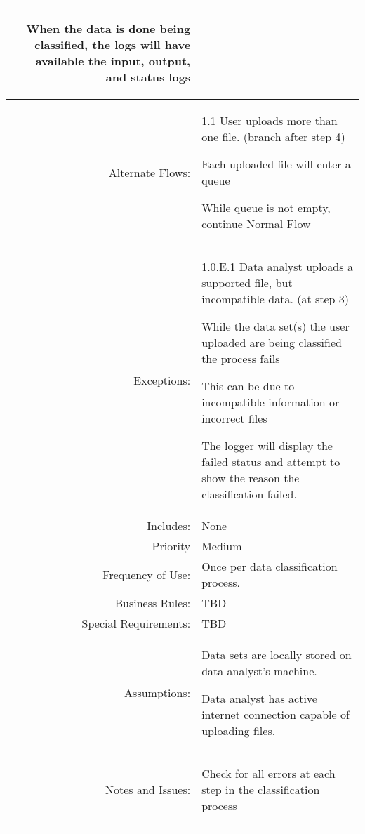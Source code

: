 \documentclass[12pt,oneside,letterpaper]{article}
\newenvironment{packed_enumerate}{ %
\vspace{-7mm}
\begin{enumerate}
  \setlength{\itemsep}{0pt}
  \setlength{\parskip}{0pt}
  \setlength{\parsep}{0pt}
}{\end{enumerate}
\vspace{-8mm}}
\begin{document}
\begin{longtable}{|r|p{3.8in}|}
\begin{packed_enumerate}
\item When the data is done being classified, the logs will have available the input, output, and status logs
\end{packed_enumerate}\\
\hline
Alternate Flows:&1.1 User uploads more than one file. (branch after step 4)\newline
\begin{packed_enumerate}
\item Each uploaded file will enter a queue
\item While queue is not empty, continue Normal Flow
\end{packed_enumerate}\\
\hline
Exceptions:&1.0.E.1 Data analyst uploads a supported file, but incompatible data. (at step 3)\newline
\begin{packed_enumerate}
\item While the data set(s) the user uploaded are being classified the process fails
\item This can be due to incompatible information or incorrect files
\item The logger will display the failed status and attempt to show the reason the classification failed.
\end{packed_enumerate}\\
\hline
Includes:&None\\
\hline
Priority&Medium\\
\hline
Frequency of Use:&Once per data classification process.\\
\hline
Business Rules:&TBD\\
\hline
Special Requirements:&TBD\\
\hline
Assumptions:&\begin{packed_enumerate}
\item Data sets are locally stored on data analyst's machine.
\item Data analyst has active internet connection capable of uploading files.
\end{packed_enumerate}\\
\hline
Notes and Issues:&\begin{packed_enumerate}
\item Check for all errors at each step in the classification process
\end{packed_enumerate}\\
\hline
\end{longtable}
\end{document}
